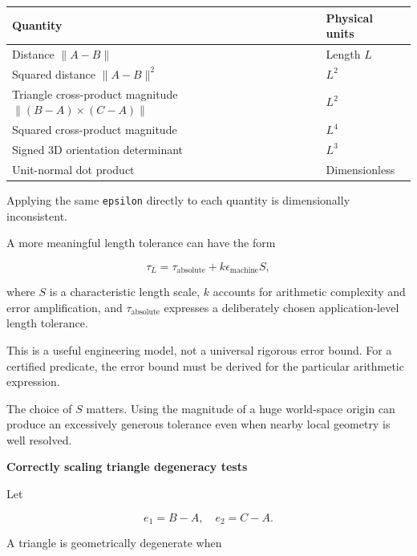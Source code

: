{\def\LTcaptype{none} %
\begin{longtable}[]{@{}
  >{\raggedright\arraybackslash}p{}
  >{\raggedright\arraybackslash}p{}@{}}
\toprule\noalign{}
\begin{minipage}[b]{\linewidth}\raggedright
Quantity
\end{minipage} & \begin{minipage}[b]{\linewidth}\raggedright
Physical units
\end{minipage} \\
\midrule\noalign{}
\endhead
\bottomrule\noalign{}
\endlastfoot
Distance \(\|A-B\|\) & Length \(L\) \\
Squared distance \(\|A-B\|^2\) & \(L^2\) \\
Triangle cross-product magnitude \(\|(B-A)\times(C-A)\|\) & \(L^2\) \\
Squared cross-product magnitude & \(L^4\) \\
Signed 3D orientation determinant & \(L^3\) \\
Unit-normal dot product & Dimensionless \\
\end{longtable}
}

Applying the same \texttt{epsilon} directly to each quantity is dimensionally inconsistent.

A more meaningful length tolerance can have the form

\[
\tau_L=\tau_{\text{absolute}}+ k\epsilon_{\text{machine}}S,
\]

where \(S\) is a characteristic length scale, \(k\) accounts for arithmetic complexity and error amplification, and \(\tau_{\text{absolute}}\) expresses a deliberately chosen application-level length tolerance.

This is a useful engineering model, not a universal rigorous error bound. For a certified predicate, the error bound must be derived for the particular arithmetic expression.

The choice of \(S\) matters. Using the magnitude of a huge world-space origin can produce an excessively generous tolerance even when nearby local geometry is well resolved.

\textbf{Correctly scaling triangle degeneracy tests}

Let

\[
e_1=B-A,\quad e_2=C-A.
\]

A triangle is geometrically degenerate when

